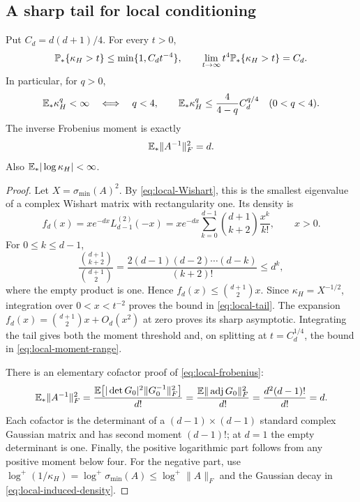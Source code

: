 \subsection{A sharp tail for local conditioning}

\begin{theorem}\label{thm:local-tail}
  Put $C_d=d(d+1)/4$.  For every $t>0$,
  \begin{equation}\label{eq:local-tail}
    \mathbb P_*\{\kappa_H>t\}\leq\min\{1,C_dt^{-4}\},
    \qquad
    \lim_{t\to\infty}t^4\mathbb P_*\{\kappa_H>t\}=C_d.
  \end{equation}
  In particular, for $q>0$,
  \begin{equation}\label{eq:local-moment-range}
    \mathbb E_*\kappa_H^q<\infty\quad\Longleftrightarrow\quad q<4,
    \qquad
    \mathbb E_*\kappa_H^q\leq\frac{4}{4-q}C_d^{q/4}
    \quad(0<q<4).
  \end{equation}
  The inverse Frobenius moment is exactly
  \begin{equation}\label{eq:local-frobenius}
    \mathbb E_*\|A^{-1}\|_F^2=d.
  \end{equation}
  Also $\mathbb E_*|\log\kappa_H|<\infty$.
\end{theorem}

\begin{proof}
  Let $X=\sigma_{\min}(A)^2$.  By \eqref{eq:local-Wishart}, this is the smallest
  eigenvalue of a complex Wishart matrix with rectangularity one.  Its density
  is \cite[Section~2.2, equation~(15)]{kumar2017smallest}
  \begin{equation}\label{eq:local-smallest-density}
    f_d(x)=x e^{-dx}L_{d-1}^{(2)}(-x)
    =x e^{-dx}\sum_{k=0}^{d-1}
        \binom{d+1}{k+2}\frac{x^k}{k!},\qquad x>0.
  \end{equation}
  For $0\leq k\leq d-1$,
  \[
    \frac{\binom{d+1}{k+2}}{\binom{d+1}{2}}
      =\frac{2(d-1)(d-2)\cdots(d-k)}{(k+2)!}
      \leq d^k,
  \]
  where the empty product is one.  Hence
  $f_d(x)\leq\binom{d+1}{2}x$.  Since
  $\kappa_H=X^{-1/2}$, integration over $0<x<t^{-2}$ proves the bound in
  \eqref{eq:local-tail}.  The expansion
  $f_d(x)=\binom{d+1}{2}x+O_d(x^2)$ at zero proves its sharp asymptotic.
  Integrating the tail gives both the moment threshold and, on splitting at
  $t=C_d^{1/4}$, the bound in \eqref{eq:local-moment-range}.

  There is an elementary cofactor proof of \eqref{eq:local-frobenius}:
  \[
    \mathbb E_*\|A^{-1}\|_F^2
      =\frac{\mathbb E\bigl[|\det G_0|^2\|G_0^{-1}\|_F^2\bigr]}{d!}
      =\frac{\mathbb E\|\operatorname{adj}G_0\|_F^2}{d!}
      =\frac{d^2(d-1)!}{d!}=d.
  \]
  Each cofactor is the determinant of a $(d-1)\times(d-1)$ standard complex
  Gaussian matrix and has second moment $(d-1)!$; at $d=1$ the empty
  determinant is one.  Finally, the positive logarithmic part follows from
  any positive moment below four.  For the negative part, use
  $\log^+(1/\kappa_H)=\log^+\sigma_{\min}(A)
   \leq\log^+\|A\|_F$ and the Gaussian decay in
  \eqref{eq:local-induced-density}.
\end{proof}

